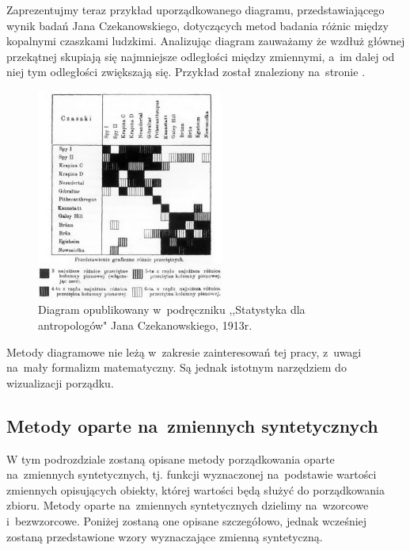 \documentclass[12pt,a4paper]{report}
\begin{document}

Zaprezentujmy teraz przykład uporządkowanego diagramu, przedstawiającego wynik badań Jana Czekanowskiego, dotyczących metod badania różnic między kopalnymi czaszkami ludzkimi. Analizując diagram zauważamy że wzdłuż głównej przekątnej skupiają się najmniejsze odległości między zmiennymi, a~im dalej od niej tym odległości zwiększają się. Przykład został znaleziony na~stronie \cite{czekanowski}. 
\begin{figure}[h]
\centering
\includegraphics[width=0.55\textwidth]{img/diagram_maczek.jpg}
\caption{Diagram opublikowany w~podręczniku ,,Statystyka dla antropologów" Jana Czekanowskiego, 1913r. \cite{czekanowski}}
\end{figure}

Metody diagramowe nie leżą w~zakresie zainteresowań tej pracy, z~uwagi na~mały formalizm matematyczny. Są jednak istotnym narzędziem do wizualizacji porządku. 




\subsection{Metody oparte na~zmiennych syntetycznych}

W tym podrozdziale zostaną opisane metody porządkowania oparte na~zmiennych syntetycznych, tj. funkcji wyznaczonej na~podstawie wartości zmiennych opisujących obiekty, której wartości będą służyć do porządkowania zbioru. Metody oparte na~zmiennych syntetycznych dzielimy na~wzorcowe i~bezwzorcowe. Poniżej zostaną one opisane szczegółowo, jednak wcześniej zostaną przedstawione wzory wyznaczające zmienną syntetyczną. 
\end{document}

